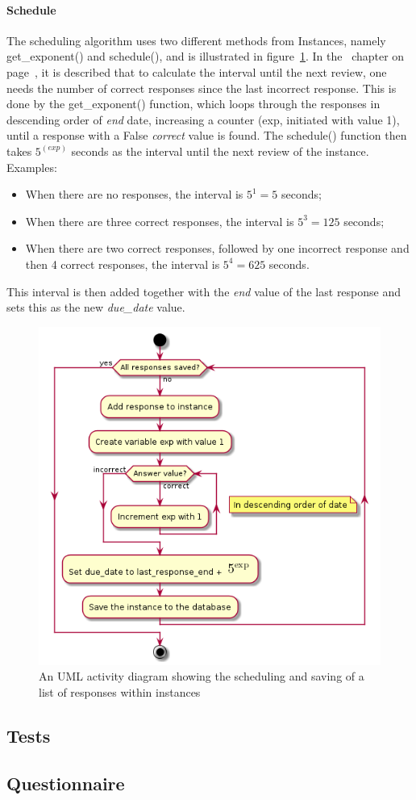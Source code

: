 \paragraph{Schedule} The scheduling algorithm uses two different methods from Instances, namely get\_exponent() and schedule(), and is illustrated in figure~\ref{fig:learningserver}. In the~ chapter on page~\pageref{ch:frameworks}, it is described that to calculate the interval until the next review, one needs the number of correct responses since the last incorrect response. This is done by the get\_exponent() function, which loops through the responses in descending order of \emph{end} date, increasing a counter (exp, initiated with value 1), until a response with a False \emph{correct} value is found. The schedule() function then takes $5^(exp)$ seconds as the interval until the next review of the instance. Examples:
%
\begin{itemize}
        \item When there are no responses, the interval is $5^1=5$ seconds;
        \item When there are three correct responses, the interval is $5^3=125$ seconds;
        \item When there are two correct responses, followed by one incorrect response and then 4 correct responses, the interval is $5^4=625$ seconds.
\end{itemize}
%
This interval is then added together with the \emph{end} value of the last response and sets this as the new \emph{due\_date} value.

\begin{figure}
\centering
    \includegraphics[height=.5\textheight]{img/learningserver.png}
\caption{An UML activity diagram showing the scheduling and saving of a list of responses within instances}
\label{fig:learningserver}
\end{figure}

\subsection{Tests}

\subsection{Questionnaire}
